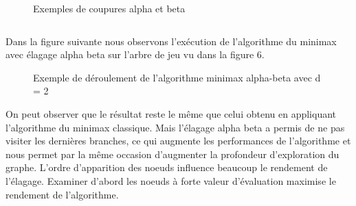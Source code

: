 \documentclass[11pt]{article}
\begin{document}
\begin{figure}[h]
  \caption {Exemples de coupures alpha et beta}
  \noindent{}
\end{figure}

{\noindent}{\noindent}\begin{tabular}{l}
 
\end{tabular}{\hspace*{\fill}}{\smallskip}

Dans la figure suivante nous observons l'exécution de l'algorithme du
minimax avec élagage alpha beta sur l'arbre de jeu vu dans la figure 6.


\begin{figure}[h]
  \caption {Exemple de déroulement de l'algorithme minimax alpha-beta avec d = 2}
  \noindent{}
\end{figure}

On peut observer que le résultat reste le même que celui obtenu en
appliquant l'algorithme du minimax classique. Mais l'élagage alpha beta a
permis de ne pas visiter les dernières branches, ce qui augmente les
performances de l'algorithme et nous permet par la même occasion
d'augmenter la profondeur d'exploration du graphe. L'ordre d'apparition des
noeuds influence beaucoup le rendement de l'élagage. Examiner d'abord les
noeuds à forte valeur d'évaluation maximise le rendement de
l'algorithme.
\end{document}
